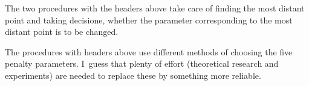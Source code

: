 The two procedures with the headers above take care of finding the most
distant point and taking decisione, whether the parameter corresponding to
the most distant point is to be changed.


\vspace{\medskipamount}

The procedures with headers above use different methods of choosing the five
penalty parameters. I~guess that plenty of effort (theoretical research and
experiments) are needed to replace these by something more reliable.



